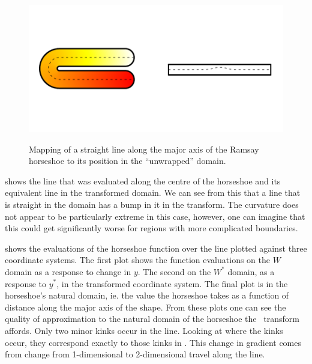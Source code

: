 \begin{figure}
\centering
\includegraphics[trim=0.5in 1in 0in 1in]{sc/figs/horseshoecentreline.pdf} \\
\caption{Mapping of a straight line along the major axis of the Ramsay horseshoe to its position in the ``unwrapped'' domain.}
\label{horseshoecentreline}
\end{figure}

 shows the line that was evaluated along the centre of the horseshoe and its equivalent line in the transformed domain. We can see from this that a line that is straight in the domain has a bump in it in the transform. The curvature does not appear to be particularly extreme in this case, however, one can imagine that this could get significantly worse for regions with more complicated boundaries.

 shows the evaluations of the horseshoe function over the line plotted against three coordinate systems. The first plot shows the function evaluations on the $W$ domain as a response to change in $y$. The second on the $W^*$ domain, as a response to $y^*$, in the transformed coordinate system. The final plot is in the horseshoe's natural domain, ie. the value the horseshoe takes as a function of distance along the major axis of the shape. From these plots one can see the quality of approximation to the natural domain of the horseshoe the \sch\ transform affords. Only two minor kinks occur in the line. Looking at where the kinks occur, they correspond exactly to those kinks in . This change in gradient comes from change from 1-dimensional to 2-dimensional travel along the line.

